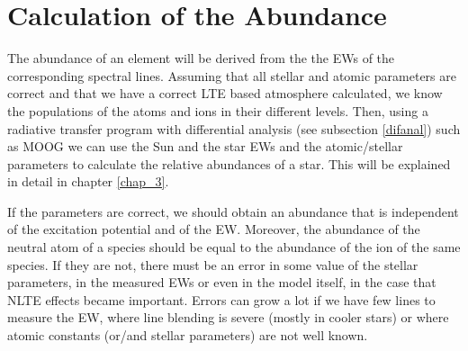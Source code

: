 \documentclass[dvips,12pt,a4paper]{report}
\begin{document}
{%

\section{Calculation of the Abundance}
\label{calab}

The abundance of an element will be derived from the the EWs of the corresponding spectral lines. %
Assuming that all stellar and atomic parameters are correct and that we have a correct LTE based atmosphere calculated, we know the populations of the atoms and ions in their different levels. Then, using a radiative transfer program with differential analysis (see subsection \ref{difanal}) such as MOOG \citep{Sneden-1973} we can use the Sun and the star EWs and the atomic/stellar parameters to calculate the relative abundances of a star. This will be explained in detail in chapter \ref{chap_3}.

If the parameters are correct, we should obtain an abundance that is independent of the excitation potential and of the EW. Moreover, the abundance of the neutral atom of a species should be equal to the abundance of the ion of the same species. If they are not, there must be an error in some value of the stellar parameters, in the measured EWs or even in the model itself, in the case that NLTE effects became important. Errors can grow a lot if we have few lines to measure the EW, where line blending is severe (mostly in cooler stars) or where atomic constants (or/and stellar parameters) are not well known.



}
\end{document}
